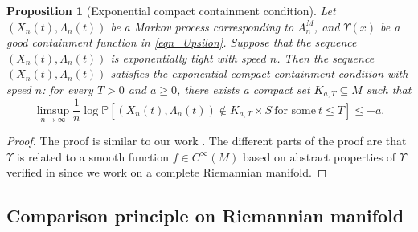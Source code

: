 \documentclass[a4paper]{article}
\numberwithin{equation}{section}
\newtheorem{proposition}[theorem]{Proposition}
\theoremstyle{definition}
\begin{document}
\begin{proposition}[Exponential compact containment condition]\label{pro_expo}
 Let $(X_n(t),\Lambda_n(t))$ be a Markov process corresponding to $A^M_n$, and $\Upsilon(x)$ be a good containment function in \eqref{eqn_Upsilon}. 
    Suppose that the sequence $(X_n(t),\Lambda_n(t))$ is exponentially tight with speed $n$.
    Then the sequence $(X_n(t),\Lambda_n(t))$ satisfies the exponential compact containment condition with speed $n$: for every $T > 0$ and $a \geq  0$, there exists a compact set $K_{a,T}\subseteq M$ such that
    \begin{equation*}
        \limsup_{n\to \infty} \frac{1}{n}\log \mathbb{P}[(X_n(t),\Lambda_n(t))\notin K_{a,T}\times S ~\mbox{for~some}~t\leq T]\leq -a.
    \end{equation*}
\end{proposition}

\begin{proof}
   The proof is similar to our work \cite[Proposition 5.4]{HKX2023}. 
   The different parts of the proof are that $\Upsilon$ is related to a smooth function $f\in C^\infty(M)$ based on abstract properties of $\Upsilon$ verified in  since we work on a complete Riemannian manifold.
\end{proof}


\subsection{Comparison principle on Riemannian manifold}
\end{document}
